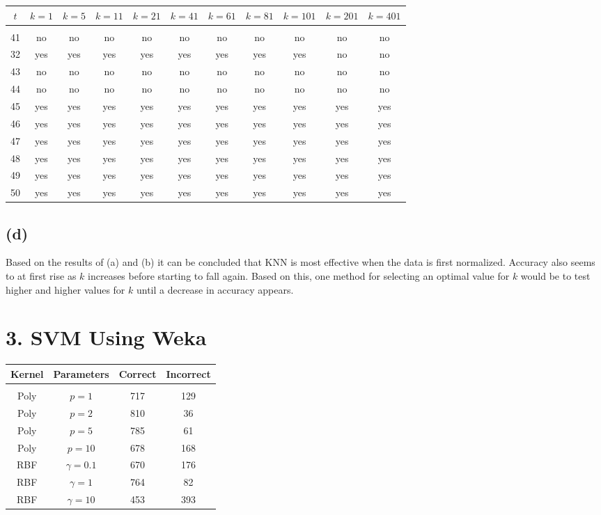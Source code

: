 \documentclass[12pt]{article}
\begin{document}
	\begin{tabular}{c | c | c | c | c | c | c | c | c | c | c}
		$t$ & $k=1$ & $k=5$ & $k=11$ & $k=21$ & $k=41$ & $k=61$ & $k=81$ & $k=101$ & $k=201$ & $k=401$ \\
		\hline & & & & & & & & & & \\
		41 & no  & no  & no  & no  & no  & no  & no  & no  & no  & no  \\
		32 & yes & yes & yes & yes & yes & yes & yes & yes & no  & no  \\
		43 & no  & no  & no  & no  & no  & no  & no  & no  & no  & no  \\
		44 & no  & no  & no  & no  & no  & no  & no  & no  & no  & no  \\
		45 & yes & yes & yes & yes & yes & yes & yes & yes & yes & yes \\
		46 & yes & yes & yes & yes & yes & yes & yes & yes & yes & yes \\
		47 & yes & yes & yes & yes & yes & yes & yes & yes & yes & yes \\
		48 & yes & yes & yes & yes & yes & yes & yes & yes & yes & yes \\
		49 & yes & yes & yes & yes & yes & yes & yes & yes & yes & yes \\
		50 & yes & yes & yes & yes & yes & yes & yes & yes & yes & yes \\
	\end{tabular}

	\subsection*{(d)}
	Based on the results of (a) and (b) it can be concluded that KNN is most effective when the data is first normalized. Accuracy also seems to at first rise as $k$ increases before starting to fall again. Based on this, one method for selecting an optimal value for $k$ would be to test higher and higher values for $k$ until a decrease in accuracy appears.
	\section*{3. SVM Using Weka}
	\begin{tabular}{c | c | c | c}
		Kernel & Parameters & Correct & Incorrect \\
		\hline & & & \\
		Poly & $p=1$ & 717 & 129 \\
		Poly & $p=2$ & 810 & 36 \\
		Poly & $p=5$ & 785 & 61 \\
		Poly & $p=10$ & 678 & 168 \\
		RBF & $\gamma=0.1$ & 670 & 176 \\
		RBF & $\gamma=1$ & 764 & 82 \\
		RBF & $\gamma=10$ & 453 & 393
	\end{tabular} \\
	
\end{document}
